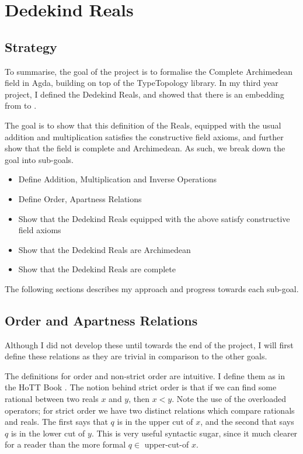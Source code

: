 \documentclass[ProjectReport]{subfiles}
\begin{document}
\section{Dedekind Reals}
\subsection{Strategy}

To summarise, the goal of the project is to formalise the Complete Archimedean field in Agda, building on top of the TypeTopology library. In my third year project, I defined the Dedekind Reals, and showed that there is an embedding from  to . 

The goal is to show that this definition of the Reals, equipped with the usual addition and multiplication satisfies the constructive field axioms, and further show that the field is complete and Archimedean. As such, we break down the goal into sub-goals. 

\begin{itemize}
    \item Define Addition, Multiplication and Inverse Operations
    \item Define Order, Apartness Relations
    \item Show that the Dedekind Reals equipped with the above satisfy constructive field axioms
    \item Show that the Dedekind Reals are Archimedean
    \item Show that the Dedekind Reals are complete
\end{itemize}

The following sections describes my approach and progress towards each sub-goal.

\subsection{Order and Apartness Relations}

Although I did not develop these until towards the end of the project, I will first define these relations as they are trivial in comparison to the other goals.


The definitions for order and non-strict order are intuitive. I define them as in the HoTT Book \cite[Section 11.2.1]{hottbook}. The notion behind strict order is that if we can find some rational between two reals $x$ and $y$, then $x < y$. Note the use of the overloaded operators; for strict order we have two distinct relations which compare rationals and reals. The first says that $q$ is in the upper cut of $x$, and the second that says $q$ is in the lower cut of $y$. This is very useful syntactic sugar, since it much clearer for a reader than the more formal $q \in$ upper-cut-of $x$.
\end{document}
